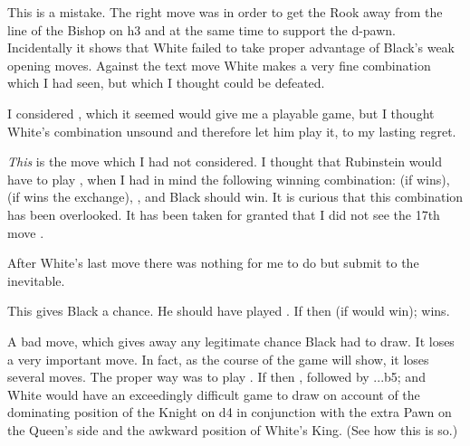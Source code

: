 \documentclass[10pt,twoside]{article}
\begin{document}
This is a mistake. The right move was  in order to get the Rook away from the line
of the Bishop on h3 and at the same time to support the d-pawn. Incidentally it shows that White
failed to take proper advantage of Black's weak opening moves. Against the text move White makes a
very fine combination which I had seen, but which I thought could be defeated.

\label{bxf6}

I considered , which it seemed would give me a playable game, but I thought White's
combination unsound and therefore let him play it, to my lasting regret.

\board


\board

\label{kg2}

\emph{This} is the move which I had not considered. I thought that Rubinstein would have to play
, when I had in mind the following winning combination:
 (if  wins),
 (if  wins the exchange),
, and Black should win. It is curious that this
combination has been overlooked. It has been taken for granted that I did not see the 17th move
.


After White's last move there was nothing for me to do but submit to the inevitable.


This gives Black a chance. He should have played . If then
 (if  would win);
 wins.


\board

\label{asix}

A bad move, which gives away any legitimate chance Black had to draw. It loses a very important
move. In fact, as the course of the game will show, it loses several moves. The proper way was to
play . If then , followed by ...b5;
and White would have an exceedingly difficult game to draw on account of the dominating position of
the Knight on d4 in conjunction with the extra Pawn on the Queen's side and the awkward position of
White's King. (See how this is so.)
\end{document}

